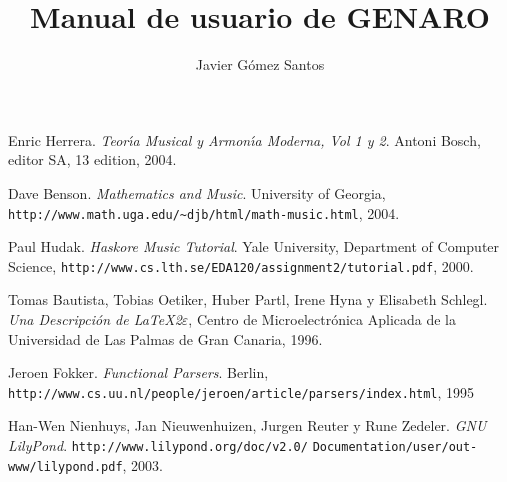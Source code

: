 \documentclass[a4paper,11pt]{article}
\author{Javier G\'omez Santos}
\title{Manual de usuario de GENARO}
\begin{document}
\begin{thebibliography}{9}

 Enric Herrera. \textit{Teor\'\i a Musical y Armon\'\i a Moderna, Vol 1 y 2}. Antoni Bosch, editor SA, 13 edition, 2004.

 Dave Benson. \textit{Mathematics and Music}. University of Georgia, \verb+http://www.math.uga.edu/~djb/html/math-music.html+, 2004.

 Paul Hudak. \textit{Haskore Music Tutorial}. Yale University, Department of Computer Science, \verb+http://www.cs.lth.se/EDA120/assignment2/tutorial.pdf+, 2000.

 Tomas Bautista, Tobias Oetiker, Huber Partl, Irene Hyna y Elisabeth Schlegl. \textit{Una Descripci\'on de \LaTeX 2$\varepsilon$}, Centro de Microelectr\'onica Aplicada de la Universidad de Las Palmas de Gran Canaria, 1996.

 Jeroen Fokker. \textit{Functional Parsers}. Berlin, \verb+http://www.cs.uu.nl/people/jeroen/article/parsers/index.html+, 1995

 Han-Wen Nienhuys, Jan Nieuwenhuizen, Jurgen Reuter y Rune Zedeler. \textit{GNU LilyPond}. \verb+http://www.lilypond.org/doc/v2.0/+ \verb+Documentation/user/out-www/lilypond.pdf+, 2003.

\end{thebibliography}
\end{document}
